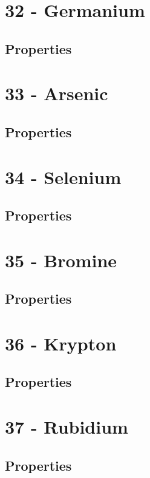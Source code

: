 \documentclass{book}
\begin{document}
\section{32 - Germanium}
\label{sec:elem-germanium}
\subsection{Properties}

\section{33 - Arsenic}
\label{sec:elem-arsenic}
\subsection{Properties}

\section{34 - Selenium}
\label{sec:elem-selenium}
\subsection{Properties}

\section{35 - Bromine}
\label{sec:elem-bromine}
\subsection{Properties}

\section{36 - Krypton}
\label{sec:elem-krypton}
\subsection{Properties}

\section{37 - Rubidium}
\label{sec:elem-rubidium}
\subsection{Properties}
\end{document}
